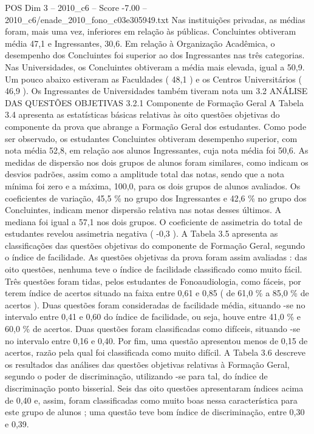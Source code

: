 \begin{textsample}{POS Dim 3 – 2010\_c6 – Score -7.00 – 2010\_c6/enade\_2010\_fono\_c03e305949.txt}
Nas instituições privadas, as médias foram, mais uma vez, inferiores em relação às públicas.
Concluintes obtiveram média 47,1 e Ingressantes, 30,6.
Em relação à Organização Acadêmica, o desempenho dos Concluintes foi superior ao dos Ingressantes nas três categorias.
Nas Universidades, os Concluintes obtiveram a média mais elevada, igual a 50,9.
Um pouco abaixo estiveram as Faculdades ( 48,1 ) e os Centros Universitários ( 46,9 ).
Os Ingressantes de Universidades também tiveram nota um 3.2 ANÁLISE DAS QUESTÕES OBJETIVAS 3.2.1 Componente de Formação Geral A Tabela 3.4 apresenta as estatísticas básicas relativas às oito questões objetivas do componente da prova que abrange a Formação Geral dos estudantes.
Como pode ser observado, os estudantes Concluintes obtiveram desempenho superior, com nota média 52,8, em relação aos alunos Ingressantes, cuja nota média foi 50,6.
As medidas de dispersão nos dois grupos de alunos foram similares, como indicam os desvios padrões, assim como a amplitude total das notas, sendo que a nota mínima foi zero e a máxima, 100,0, para os dois grupos de alunos avaliados.
Os coeficientes de variação, 45,5 \% no grupo dos Ingressantes e 42,6 \% no grupo dos Concluintes, indicam menor dispersão relativa nas notas desses últimos.
A mediana foi igual a 57,1 nos dois grupos.
O coeficiente de assimetria do total de estudantes revelou assimetria negativa ( -0,3 ).
A Tabela 3.5 apresenta as classificações das questões objetivas do componente de Formação Geral, segundo o índice de facilidade.
As questões objetivas da prova foram assim avaliadas : das oito questões, nenhuma teve o índice de facilidade classificado como muito fácil.
Três questões foram tidas, pelos estudantes de Fonoaudiologia, como fáceis, por terem índice de acertos situado na faixa entre 0,61 e 0,85 ( de 61,0 \% a 85,0 \% de acertos ).
Duas questões foram consideradas de facilidade média, situando -se no intervalo entre 0,41 e 0,60 do índice de facilidade, ou seja, houve entre 41,0 \% e 60,0 \% de acertos.
Duas questões foram classificadas como difíceis, situando -se no intervalo entre 0,16 e 0,40.
Por fim, uma questão apresentou menos de 0,15 de acertos, razão pela qual foi classificada como muito difícil.
A Tabela 3.6 descreve os resultados das análises das questões objetivas relativas à Formação Geral, segundo o poder de discriminação, utilizando -se para tal, do índice de discriminação ponto bisserial.
Seis das oito questões apresentaram índices acima de 0,40 e, assim, foram classificadas como muito boas nessa característica para este grupo de alunos ; uma questão teve bom índice de discriminação, entre 0,30 e 0,39.

\end{textsample}
